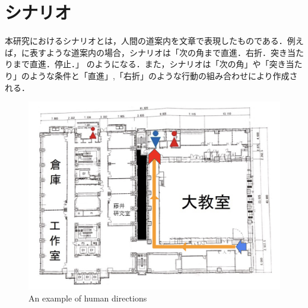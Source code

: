 \documentclass[../main]{subfiles}
\begin{document}
         \section{シナリオ}
             本研究におけるシナリオとは，人間の道案内を文章で表現したものである．例えば，に表すような道案内の場合，シナリオは「次の角まで直進．右折．突き当たりまで直進．停止．」
             のようになる．また，シナリオは「次の角」や「突き当たり」のような条件と「直進」,「右折」のような行動の組み合わせにより作成される．
             
        
         \begin{figure}[H]
          \centering
          \includegraphics[width=12cm]{../images/scenario_fig}
          \caption{An example of human directions}
          \label{figure::scenario_exp}
         \end{figure}

         \newpage
          
\end{document}
